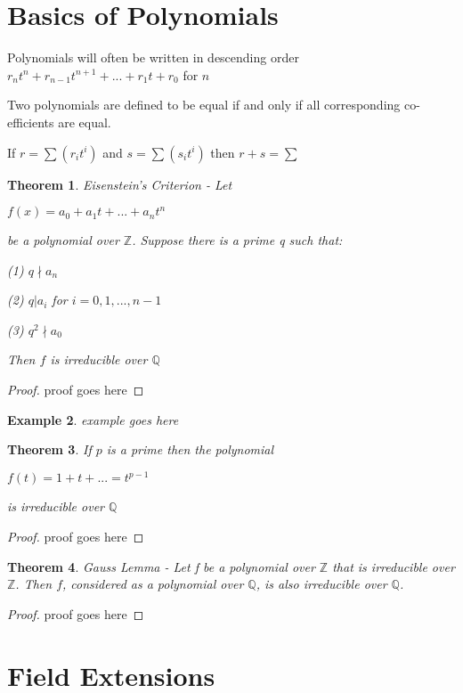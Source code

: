 \documentclass[12pt]{article}
\newtheorem{theorem}{Theorem}
\newtheorem{example}[theorem]{Example}
\newcommand{\Z}{\mathbb Z}
\newcommand{\Q}{\mathbb Q}
\begin{document}
\section{Basics of Polynomials}
Polynomials will often be written in descending order $r_n t^n + r_{n-1} t^{n+1} + ... + r_1 t + r_0$ for $n$

Two polynomials are defined to be equal if and only if all corresponding co-efficients are equal.

If $r = \sum (r_i t^i)$ and $s = \sum (s_i t^i)$ then $r+s = \sum$

\begin{theorem}
    Eisenstein's Criterion - Let 
    
    $f(x) = a_0 + a_1 t + ... + a_n t^n$
    
    be a polynomial over $\Z$. Suppose there is a prime q such that:
    
    (1) $q \nmid a_n$

    (2) $q | a_i$ for $i = {0, 1,..., n-1}$

    (3) $q^2 \nmid a_0$

    Then $f$ is irreducible over $\Q$
\end{theorem}

\begin{proof}
proof goes here
\end{proof}

\begin{example}
    example goes here
\end{example}

\begin{theorem}
    If $p$ is a prime then the polynomial

    $f(t) = 1 + t + ... = t^{p-1}$

    is irreducible over $\Q$
\end{theorem}

\begin{proof}
    proof goes here
\end{proof}

\begin{theorem}
    Gauss Lemma - Let f be a polynomial over $\Z$ that is irreducible over $\Z$. Then $f$, considered as a polynomial over $\Q$, is also irreducible over $\Q$.
\end{theorem}

\begin{proof}
    proof goes here
\end{proof}

\section{Field Extensions}
\end{document}
